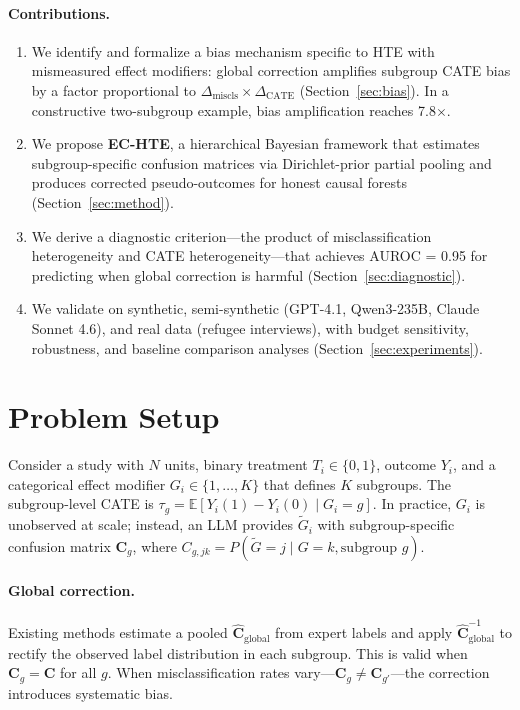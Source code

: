 \documentclass[11pt,a4paper]{article}
\begin{document}
\paragraph{Contributions.}
\begin{enumerate}[nosep,leftmargin=*]
\item We identify and formalize a bias mechanism specific to HTE with mismeasured effect modifiers: global correction amplifies subgroup CATE bias by a factor proportional to $\Delta_{\text{miscls}} \times \Delta_{\text{CATE}}$ (Section~\ref{sec:bias}). In a constructive two-subgroup example, bias amplification reaches 7.8$\times$.
\item We propose \textbf{EC-HTE}, a hierarchical Bayesian framework that estimates subgroup-specific confusion matrices via Dirichlet-prior partial pooling and produces corrected pseudo-outcomes for honest causal forests (Section~\ref{sec:method}).
\item We derive a diagnostic criterion---the product of misclassification heterogeneity and CATE heterogeneity---that achieves AUROC = 0.95 for predicting when global correction is harmful (Section~\ref{sec:diagnostic}).
\item We validate on synthetic, semi-synthetic (GPT-4.1, Qwen3-235B, Claude Sonnet 4.6), and real data (refugee interviews), with budget sensitivity, robustness, and baseline comparison analyses (Section~\ref{sec:experiments}).
\end{enumerate}

\section{Problem Setup}
\label{sec:setup}

Consider a study with $N$ units, binary treatment $T_i \in \{0,1\}$, outcome $Y_i$, and a categorical effect modifier $G_i \in \{1,\dots,K\}$ that defines $K$ subgroups.
The subgroup-level CATE is $\tau_g = \mathbb{E}[Y_i(1) - Y_i(0) \mid G_i = g]$.
In practice, $G_i$ is unobserved at scale; instead, an LLM provides $\tilde{G}_i$ with subgroup-specific confusion matrix $\mathbf{C}_g$, where $C_{g,jk} = P(\tilde{G} = j \mid G = k, \text{subgroup } g)$.

\paragraph{Global correction.}
Existing methods estimate a pooled $\hat{\mathbf{C}}_{\text{global}}$ from expert labels and apply $\hat{\mathbf{C}}_{\text{global}}^{-1}$ to rectify the observed label distribution in each subgroup.
This is valid when $\mathbf{C}_g = \mathbf{C}$ for all $g$.
When misclassification rates vary---$\mathbf{C}_g \neq \mathbf{C}_{g'}$---the correction introduces systematic bias.
\end{document}
